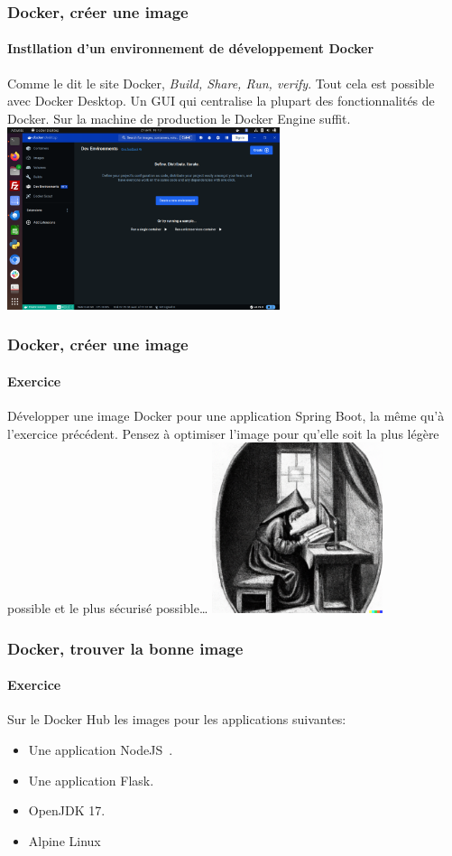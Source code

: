 \documentclass{beamer}
\begin{document}
    \begin{frame}
        \transdissolve
        \frametitle{Docker, créer une image}
        \framesubtitle{Instllation d'un environnement de développement Docker}
        Comme le dit le site Docker, \textit{Build, Share, Run, verify}.
        Tout cela est possible avec Docker Desktop.
        Un GUI qui centralise la plupart des fonctionnalités de Docker.
        \bigbreak
        Sur la machine de production le Docker Engine suffit.
        \bigbreak
        \centering
        \includegraphics[width=8cm]{image/docker-desktop.png}
    \end{frame}

    \begin{frame}
        \transdissolve
        \frametitle{Docker, créer une image}
        \framesubtitle{Exercice}
        Développer une image Docker pour une application Spring Boot, la même qu'à l'exercice précédent.
        \bigbreak
        Pensez à optimiser l'image pour qu'elle soit la plus légère possible et le plus sécurisé possible\ldots
        \bigbreak
        \centering
        \includegraphics[width=5cm]{image/young-studying.png}
    \end{frame}

    \begin{frame}
        \transdissolve
        \frametitle{Docker, trouver la bonne image}
        \framesubtitle{Exercice}
        Sur le Docker Hub les images pour les applications suivantes:
        \begin{itemize}
            \item Une application NodeJS~.
            \item Une application Flask.
            \item OpenJDK 17.
            \item Alpine Linux
        \end{itemize}
    \end{frame}
\end{document}
